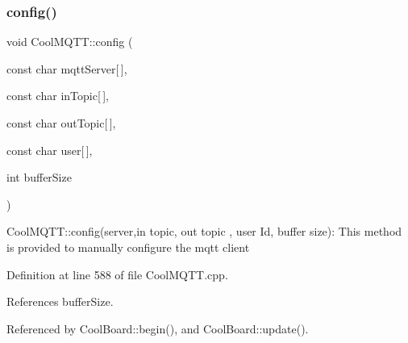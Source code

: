 \subsubsection{\texorpdfstring{config()}{config()}\hspace{0.1cm}{\footnotesize\ttfamily [1/2]}}
{\footnotesize\ttfamily void Cool\+M\+Q\+T\+T\+::config (\begin{DoxyParamCaption}\item[{const char}]{mqtt\+Server\mbox{[}$\,$\mbox{]},  }\item[{const char}]{in\+Topic\mbox{[}$\,$\mbox{]},  }\item[{const char}]{out\+Topic\mbox{[}$\,$\mbox{]},  }\item[{const char}]{user\mbox{[}$\,$\mbox{]},  }\item[{int}]{buffer\+Size }\end{DoxyParamCaption})}

Cool\+M\+Q\+T\+T\+::config(server,in topic, out topic , user Id, buffer size)\+: This method is provided to manually configure the mqtt client 

Definition at line 588 of file Cool\+M\+Q\+T\+T.\+cpp.



References buffer\+Size.



Referenced by Cool\+Board\+::begin(), and Cool\+Board\+::update().


